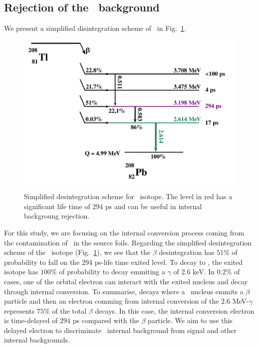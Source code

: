 \subsection{Rejection of the \Tl\ background}
We present a simplified disintegration scheme of \Tl\ in Fig.~\ref{fig:Tl_scheme}.
\begin{figure}
  \centering
  \includegraphics[width=13cm]{timedifference/fig_timediff/Tl_decay_scheme.pdf}
  \caption{Simplified desintegration scheme for \Tl\ isotope.
    The level in red has a significant life time of $294$ ps and can be useful in internal backgroung rejection.
  \label{fig:Tl_scheme}}
\end{figure}


For this study, we are focusing on the internal conversion process coming from the contamination of \Tl\ in the source foils.
Regarding the simplified desintegration scheme of the \Tl\ isotope (Fig.~\ref{fig:Tl_scheme}), we see that the $\beta$ desintegration has $51\%$ of probability to fall on the $294$ ps-life time exited level.
To decay to \Pb, the exited isotope has $100\%$ of probability to decay emmiting a $\gamma$ of $2.6$ keV.
In $0.2\%$ of cases, one of the orbital electron can interact with the exited nucleus and decay through internal conversion.
To summarise, decays where a \Tl\ nucleus emmits a $\beta$ particle and then an electron comming from internal conversion of the $2.6$ MeV-$\gamma$ represents $75\%$ of the total $\beta$ decays.
In this case, the internal conversion electron is time-delayed of $294$ ps compared with the $\beta$ particle.
We aim to use this delayed electron to discriminate \Tl\ internal background from signal and other internal backgrounds.





